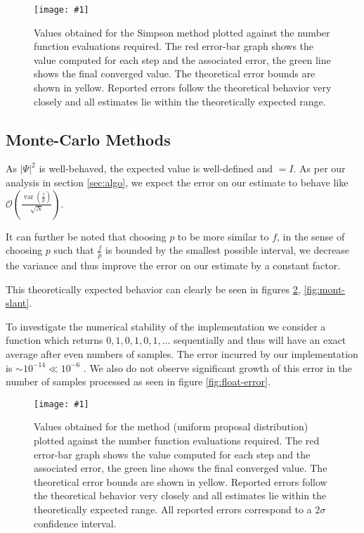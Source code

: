 \documentclass[10pt, a4paper]{article}
\newcommand{\plot}[3]{\begin{figure}[htp]\centering\texttt{[image: \#1]}\caption{#2}\label{#3}\end{figure}}
\begin{document}
  \plot{proj-simp-accuracy}{
    Values obtained for the Simpson method plotted against the number function evaluations required. The red
    error-bar graph shows the value computed for each step and the associated error, the green line
    shows the final converged value. The theoretical error bounds are shown in yellow. Reported errors
    follow the theoretical behavior very closely and all estimates lie within the theoretically expected range.
  }{fig:simp}

  \subsection{Monte-Carlo Methods}
  As $|\Psi|^2$ is well-behaved, the expected value is well-defined and $= I$. As per our
  analysis in section \ref{sec:algo}, we expect the error on our estimate to behave like
  $\mathcal{O}\left( \frac{\operatorname{var}(\frac fp)}{\sqrt N} \right)$.

  It can further be noted that choosing $p$ to be more similar to $f$, in the sense of choosing $p$
  such that $\frac fp$ is bounded by the smallest possible interval, we decrease the variance and thus
  improve the error on our estimate by a constant factor.

  This theoretically expected behavior can clearly be seen in figures \ref{fig:mont-flat}, \ref{fig:mont-slant}.

  To investigate the numerical stability of the implementation
  we consider a function which returns $0,1,0,1,0,1,\dots$ sequentially and thus will have an
  exact average after even numbers of samples. The error incurred by our implementation is
  $\sim 10^{-14} \ll 10^{-6}$ \footnotemark. We
  also do not observe significant growth of this error in the number of samples processed as
  seen in figure \ref{fig:float-error}.


  \plot{proj-mont-flat-accuracy}{
    Values obtained for the \is{} method (uniform proposal distribution) plotted against the number
    function evaluations required. The red
    error-bar graph shows the value computed for each step and the associated error, the green line
    shows the final converged value. The theoretical error bounds are shown in yellow. Reported errors
    follow the theoretical behavior very closely and all estimates lie within the theoretically expected range.
    All reported errors correspond to a $2\sigma$ confidence interval.
  }{fig:mont-flat}
\end{document}
